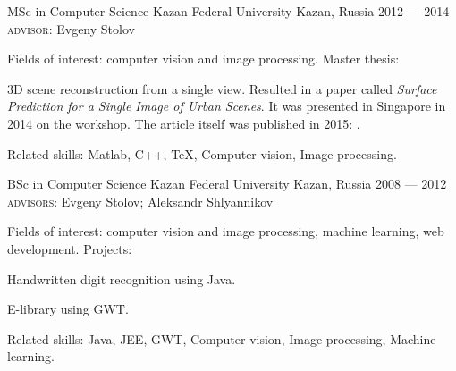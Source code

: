 

\begin{cventries}

  \cveducation
    {MSc in Computer Science} %
    {Kazan Federal University} %
    {Kazan, Russia} %
    {2012 --- 2014} %
    {\textsc{advisor}: Evgeny Stolov}
    {
    Fields of interest: computer vision and image processing. Master thesis:
      \begin{cvitems} %
      \item{3D scene reconstruction from a single view. Resulted in a paper called \textit{Surface Prediction for a Single Image of Urban Scenes}. It was presented in Singapore in 2014 on the  workshop. The article itself was published in 2015: .}
      \end{cvitems}
      Related skills: Matlab, C++, \TeX, Computer vision, Image processing.
    }
    
  \cveducation
    {BSc in Computer Science} %
    {Kazan Federal University} %
    {Kazan, Russia} %
    {2008 --- 2012} %
    {\textsc{advisors}: Evgeny Stolov; Aleksandr Shlyannikov}
    {
    Fields of interest: computer vision and image processing, machine learning, web development. Projects: 
      \begin{cvitems} %
      \item{Handwritten digit recognition using Java.}
      \item{E-library using GWT.}
      \end{cvitems}
      Related skills: Java, JEE, GWT, Computer vision, Image processing, Machine learning.
    }

\end{cventries}
